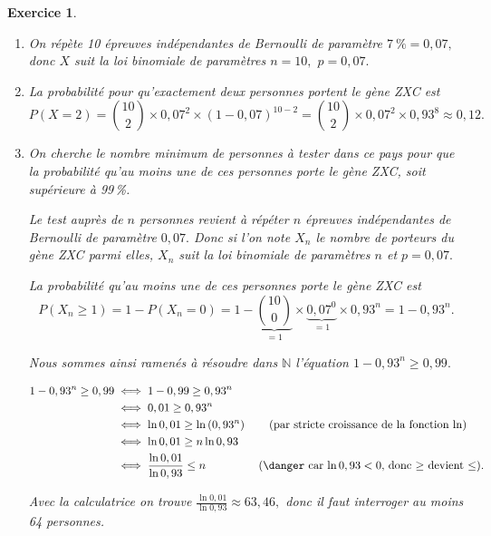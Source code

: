 \documentclass[10pt]{article}
\newtheorem{exo}{Exercice}
\begin{document}
\begin{exo}


	\begin{enumerate}
		\item On répète 10 épreuves indépendantes de Bernoulli de paramètre $7~\%=0,07,$ donc $X$ suit la loi binomiale de paramètres $n=10,$ $p=0,07.$
		\item La probabilité pour qu'exactement deux personnes portent le gène ZXC est
		\[P(X=2)=\binom{10}{2}\times 0,07^2\times (1-0,07)^{10-2}
		=\binom{10}{2}\times 0,07^2\times 0,93^8
		\approx 0,12.
		\]

\item On cherche le nombre minimum de personnes à tester dans ce pays pour que la probabilité qu'au moins une de ces personnes porte le gène ZXC, soit supérieure à 99\,\%.

\medskip

Le test auprès de $n$ personnes revient à répéter $n$ épreuves indépendantes de Bernoulli de paramètre $0,07.$ Donc si l'on note $X_n$ le nombre de porteurs du gène ZXC parmi elles, $X_n$ suit la loi binomiale de paramètres $n$ et $p=0,07.$

\medskip

La probabilité qu'au moins une de ces personnes porte le gène ZXC est 
\[P\left(X_n\geq 1\right)=1-P\left(X_n=0\right)=1-\underbrace{\binom{10}{0}}_{=1}\times \underbrace{0,07^0}_{=1}\times 0,93^n=1-0,93^n.\]

Nous sommes ainsi ramenés à résoudre dans $\mathbb{N}$ l'équation $1-0,93^n\geq 0,99.$


\begin{align*}
1-0,93^n\geq 0,99&\iff 1-0,99\geq 0,93^n
\\ &\iff 0,01\geq 0,93^n
\\&\iff 
\ln 0,01\geq \ln \left(0,93^n\right)\qquad\text{(par stricte croissance de la fonction $\ln$)}\\
&\iff \ln 0,01\geq n\ln 0,93\\
&\iff\frac{\ln 0,01}{\ln 0,93}\leq n \qquad\qquad~~\text{(\danger car $\ln 0,93<0,$ donc $\geq$ devient $\leq$)}.
\end{align*}

Avec la calculatrice on trouve $\frac{\ln 0,01}{\ln 0,93}\approx 63,46,$ donc il faut interroger au moins 64 personnes.

\end{enumerate}

\end{exo}
\end{document}
